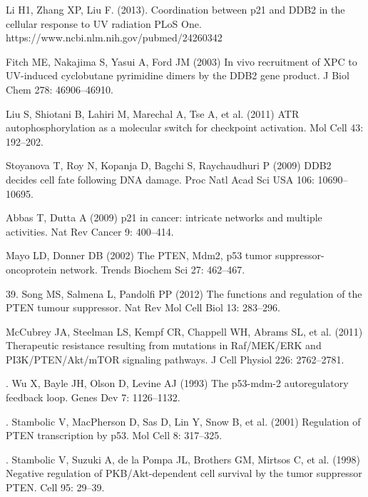 \documentclass[preprint, 8pt]{elsarticle}
\theoremstyle{definition}
\begin{document}

\begin{thebibliography}{00}
\footnotesize
{}Li H1, Zhang XP, Liu F. (2013). 
\newblock Coordination between p21 and DDB2 in the cellular response to UV radiation 
\newblock PLoS One. https://www.ncbi.nlm.nih.gov/pubmed/24260342

Fitch ME, Nakajima S, Yasui A, Ford JM (2003) 
\newblock In vivo recruitment of XPC to UV-induced cyclobutane pyrimidine dimers by the DDB2 gene product. 
\newblock J Biol Chem 278: 46906–46910.

 Liu S, Shiotani B, Lahiri M, Marechal A, Tse A, et al. (2011) 
\newblock ATR autophosphorylation as a molecular switch for checkpoint activation. 
\newblock Mol Cell 43: 192–202.

 Stoyanova T, Roy N, Kopanja D, Bagchi S, Raychaudhuri P (2009) 
\newblock DDB2 decides cell fate following DNA damage. 
\newblock Proc Natl Acad Sci USA 106: 10690–10695.

 Abbas T, Dutta A (2009) 
\newblock p21 in cancer: intricate networks and multiple activities. 
\newblock Nat Rev Cancer 9: 400–414.

 Mayo LD, Donner DB (2002) 
\newblock The PTEN, Mdm2, p53 tumor suppressor-oncoprotein network. 
\newblock Trends Biochem Sci 27: 462–467.

 39. Song MS, Salmena L, Pandolfi PP (2012) 
\newblock The functions and regulation of the PTEN tumour suppressor. 
\newblock Nat Rev Mol Cell Biol 13: 283–296.

 McCubrey JA, Steelman LS, Kempf CR, Chappell WH, Abrams SL, et al. (2011) 
\newblock Therapeutic resistance resulting from mutations in Raf/MEK/ERK and PI3K/PTEN/Akt/mTOR signaling pathways. 
\newblock J Cell Physiol 226: 2762–2781.

. Wu X, Bayle JH, Olson D, Levine AJ (1993) 
\newblock The p53-mdm-2 autoregulatory feedback loop. 
\newblock Genes Dev 7: 1126–1132.

. Stambolic V, MacPherson D, Sas D, Lin Y, Snow B, et al. (2001) 
\newblock Regulation of PTEN transcription by p53. 
\newblock Mol Cell 8: 317–325.

. Stambolic V, Suzuki A, de la Pompa JL, Brothers GM, Mirtsos C, et al. (1998)
\newblock Negative regulation of PKB/Akt-dependent cell survival by the tumor suppressor 
\newblock PTEN. Cell 95: 29–39.


\end{thebibliography}
\end{document}
